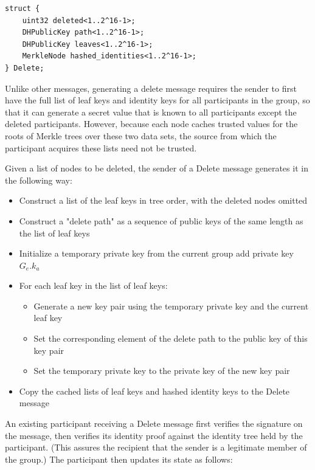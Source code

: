 \documentclass[11pt, oneside]{article}
\begin{document}
\begin{verbatim}
struct {
    uint32 deleted<1..2^16-1>;
    DHPublicKey path<1..2^16-1>;
    DHPublicKey leaves<1..2^16-1>;
    MerkleNode hashed_identities<1..2^16-1>;
} Delete;
\end{verbatim}

Unlike other messages, generating a delete message requires the sender to first have the full list of leaf keys and identity keys for all participants in the group, so that it can generate a secret value that is known to all participants except the deleted participants.  However, because each node caches trusted values for the roots of Merkle trees over these two data sets, the source from which the participant acquires these lists need not be trusted.

Given a list of nodes to be deleted, the sender of a Delete message generates it in the following way:

\begin{itemize}
\item{Construct a list of the leaf keys in tree order, with the deleted nodes omitted}
\item{Construct a "delete path" as a sequence of public keys of the same length as the list of leaf keys}
\item{Initialize a temporary private key from the current group add private key $G_e.k_a$}
\item{For each leaf key in the list of leaf keys:
	\begin{itemize}
	\item{Generate a new key pair using the temporary private key and the current leaf key}
	\item{Set the corresponding element of the delete path to the public key of this key pair}
	\item{Set the temporary private key to the private key of the new key pair}
	\end{itemize}
}
\item{Copy the cached lists of leaf keys and hashed identity keys to the Delete message}
\end{itemize}

An existing participant receiving a Delete message first verifies the signature on the message, then verifies its identity proof against the identity tree held by the participant.  (This assures the recipient that the sender is a legitimate member of the group.)  The participant then updates its state as follows:
\end{document}
